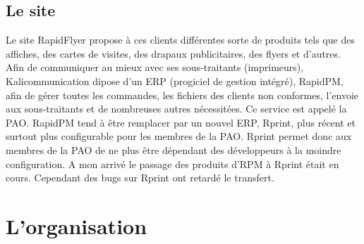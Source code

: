 \documentclass[a4paper]{report}
\begin{document}
\section{Le site}
Le site RapidFlyer propose à ces clients différentes sorte de produits tels que des affiches, des cartes de visites, des drapaux publicitaires, des flyers et d’autres. 
Afin de communiquer au mieux avec ses sous-traitants (imprimeurs), Kalicommunication dipose d’un ERP (progiciel de gestion intégré), RapidPM, afin de gérer toutes les commandes, les fichiers des clients non conformes, l’envoie aux sous-traitants et de nombreuses autres nécessitées. Ce service est appelé la PAO. RapidPM tend à être remplacer par un nouvel ERP, Rprint, plus récent et surtout plus configurable pour les membres de la PAO. Rprint permet donc aux membres de la PAO de ne plus être dépendant des développeurs à la moindre configuration. A mon arrivé le passage des produits d’RPM à Rprint était en cours. Cependant des bugs sur Rprint ont retardé le transfert. %

\chapter{L'organisation}
\end{document}
